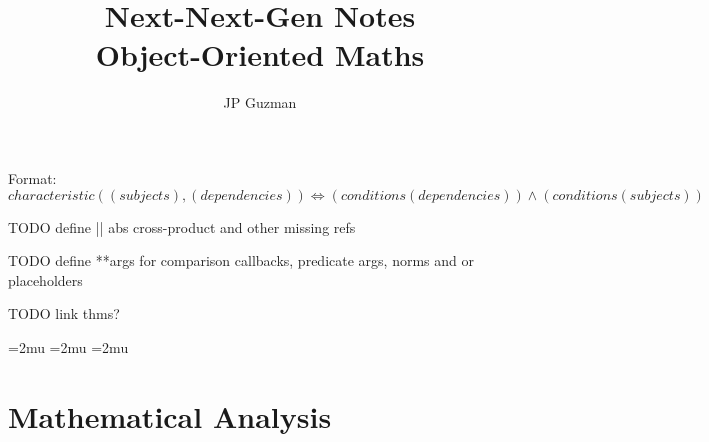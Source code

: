 \documentclass[a4paper]{article}
\title{Next-Next-Gen Notes \\
\large Object-Oriented Maths}
\author{JP Guzman}
\begin{document}
\maketitle
\allowdisplaybreaks

Format: $characteristic((subjects), (dependencies)) \iff (conditions(dependencies)) \land (conditions(subjects))$

TODO define || abs  cross-product and other missing refs

TODO define **args for comparison callbacks, predicate args, norms and or placeholders

TODO link thms?

\thinmuskip=2mu %
\medmuskip=2mu %
\thickmuskip=2mu %
\setlength{\belowdisplayskip}{0pt} \setlength{\belowdisplayshortskip}{0pt}
\setlength{\abovedisplayskip}{0pt} \setlength{\abovedisplayshortskip}{0pt}

\section{Mathematical Analysis}
\end{document}
